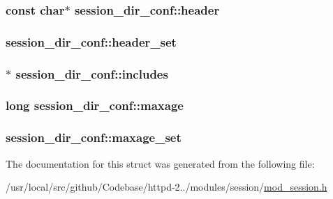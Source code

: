 \subsubsection[{\texorpdfstring{header}{header}}]{\setlength{\rightskip}{0pt plus 5cm}const char$\ast$ session\+\_\+dir\+\_\+conf\+::header}\hypertarget{structsession__dir__conf_a447e820142780b447fdeb43dbacf5fe7}{}\label{structsession__dir__conf_a447e820142780b447fdeb43dbacf5fe7}
\subsubsection[{\texorpdfstring{header\+\_\+set}{header_set}}]{ session\+\_\+dir\+\_\+conf\+::header\+\_\+set}\hypertarget{structsession__dir__conf_a1ec17c421e6aa7e00f59ff0597c0d73b}{}\label{structsession__dir__conf_a1ec17c421e6aa7e00f59ff0597c0d73b}
\subsubsection[{\texorpdfstring{includes}{includes}}]{$\ast$ session\+\_\+dir\+\_\+conf\+::includes}\hypertarget{structsession__dir__conf_a27baa9b1ab583516269f1e84a2486235}{}\label{structsession__dir__conf_a27baa9b1ab583516269f1e84a2486235}
\subsubsection[{\texorpdfstring{maxage}{maxage}}]{\setlength{\rightskip}{0pt plus 5cm}long session\+\_\+dir\+\_\+conf\+::maxage}\hypertarget{structsession__dir__conf_a581e40d0a8c41456d9275467f06cca38}{}\label{structsession__dir__conf_a581e40d0a8c41456d9275467f06cca38}
\subsubsection[{\texorpdfstring{maxage\+\_\+set}{maxage_set}}]{ session\+\_\+dir\+\_\+conf\+::maxage\+\_\+set}\hypertarget{structsession__dir__conf_a4578c2a3eee395c1e226778f4ab17eb0}{}\label{structsession__dir__conf_a4578c2a3eee395c1e226778f4ab17eb0}


The documentation for this struct was generated from the following file\+:\begin{DoxyCompactItemize}
\item 
/usr/local/src/github/\+Codebase/httpd-\/2../modules/session/\hyperlink{mod__session_8h}{mod\+\_\+session.\+h}\end{DoxyCompactItemize}
